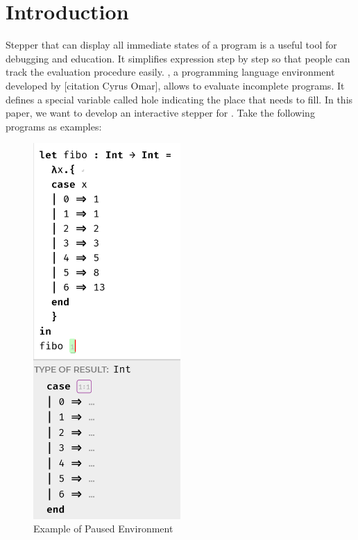 \section{Introduction}

Stepper that can display all immediate states of a program is a useful tool for debugging and education. It simplifies expression step by step so that people can track the evaluation procedure easily. \Hazel, a programming language environment developed by [citation Cyrus Omar], allows to evaluate incomplete programs. It defines a special variable called hole indicating the place that needs to fill. In this paper, we want to develop an interactive stepper for \Hazel. Take the following programs as examples:

\begin{figure}[htbp]
  \centering
  \includegraphics[width=0.5\textwidth]{img/pause_example.png}
  \caption{Example of Paused Environment}
  \label{fig:pause}
\end{figure}


